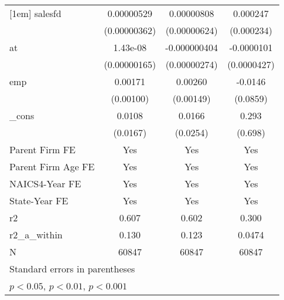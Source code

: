 {\begin{tabular}{l*{3}{c}}
[1em]
salesfd     &  0.00000529         &  0.00000808         &    0.000247         \\
            &(0.00000362)         &(0.00000624)         &  (0.000234)         \\
[1em]
at          &    1.43e-08         &-0.000000404         &  -0.0000101         \\
            &(0.00000165)         &(0.00000274)         & (0.0000427)         \\
[1em]
emp         &     0.00171         &     0.00260         &     -0.0146         \\
            &   (0.00100)         &   (0.00149)         &    (0.0859)         \\
[1em]
\_cons      &      0.0108         &      0.0166         &       0.293         \\
            &    (0.0167)         &    (0.0254)         &     (0.698)         \\
[1em]
Parent Firm FE&         Yes         &         Yes         &         Yes         \\
[1em]
Parent Firm Age FE&         Yes         &         Yes         &         Yes         \\
[1em]
NAICS4-Year FE&         Yes         &         Yes         &         Yes         \\
[1em]
State-Year FE&         Yes         &         Yes         &         Yes         \\
\hline
r2          &       0.607         &       0.602         &       0.300         \\
r2\_a\_within &       0.130         &       0.123         &      0.0474         \\
N           &       60847         &       60847         &       60847         \\
\hline\hline
\multicolumn{4}{l}{\footnotesize Standard errors in parentheses}\\
\multicolumn{4}{l}{\footnotesize \sym{*} \(p<0.05\), \sym{**} \(p<0.01\), \sym{***} \(p<0.001\)}\\
\end{tabular}
}
